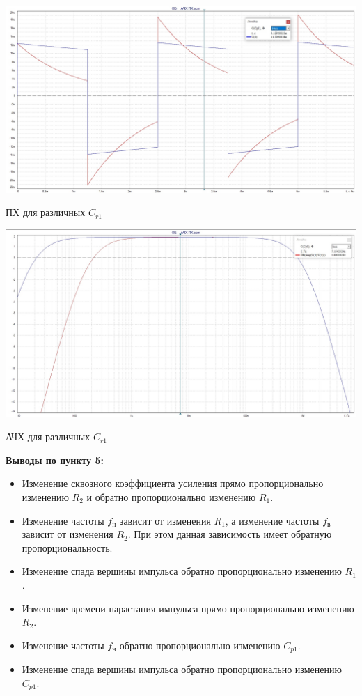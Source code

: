 \documentclass[a4paper,14pt]{extarticle}
\begin{document}
    \begin{center}
        \includegraphics[scale=0.3]{5.6.jpg}
    \end{center}
    ПХ для различных $C_{r1}$

    \begin{center}
        \includegraphics[scale=0.3]{5.7.jpg}
    \end{center}
    АЧХ для различных $C_{r1}$

    \textbf{Выводы по пункту 5:}
    \vspace{-6ex}
    \begin{singlespace}
        \begin{itemize}
            \item Изменение сквозного коэффициента усиления прямо пропорционально изменению $R_2$ и обратно пропорционально изменению $R_1$.
            \item Изменение частоты $f_{\text{н}}$ зависит от изменения $R_1$, а изменение частоты $f_{\text{в}}$ зависит от изменения $R_2$. При этом данная зависимость имеет обратную пропорциональность.
            \item Изменение спада вершины импульса обратно пропорционально изменению $R_1$.
            \item Изменение времени нарастания импульса прямо пропорционально изменению $R_2$.
            \item Изменение частоты $f_{\text{н}}$ обратно пропорционально изменению $C_{p1}$.
            \item Изменение спада вершины импульса обратно пропорционально изменению $C_{p1}$.
        \end{itemize}
    \end{singlespace}
\end{document}
